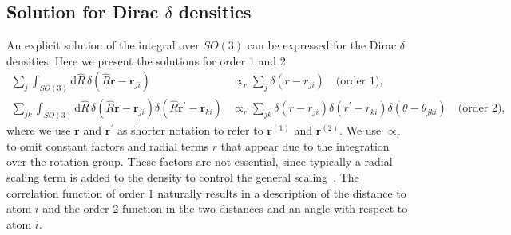 \subsection{Solution for Dirac $\delta$ densities}

An explicit solution of the integral over $SO(3)$ can be expressed for the Dirac $\delta$ densities.
Here we present the solutions for order 1 and 2 
\begin{subequations}
\label{eq:dirac_delta_haar_integral}
\begin{align}
    \label{eq:dirac_delta_haar_integral_2body}
    \sum_j \int_{SO(3)} \mathrm{d}\hat{R}\, \delta(\hat{R}\mathbf{r}-\mathbf{r}_{ji}) &\propto_r \sum_j \delta(r-r_{ji})\quad\textrm{(order 1)},  \\%
    \label{eq:dirac_delta_haar_integral_3body}
    \sum_{jk}\int_{SO(3)} \mathrm{d}\hat{R}\, \delta(\hat{R}\mathbf{r}-\mathbf{r}_{ji}) \delta(\hat{R}\mathbf{r}^\prime-\mathbf{r}_{ki}) &\propto_r \sum_{jk}\delta(r-r_{ji})\delta(r^\prime-r_{ki})\delta(\theta -\theta_{jki})\quad\textrm{(order 2)}, %
\end{align}
\end{subequations}
where we use $\mathbf{r}$ and $\mathbf{r}^\prime$ as shorter notation to refer to $\mathbf{r}^{(1)}$ and $\mathbf{r}^{(2)}$.
We use $\propto_r$ to omit constant factors and radial terms $r$ that appear due to the integration over the rotation group.
These factors are not essential, since typically a radial scaling term is added to the density to control the general scaling~\cite{behler2011atom,huan-vonl16jcp,will+18pccp,drautz2019atomic}.
The correlation function of order 1 naturally results in a description of the distance to atom $i$ and the order 2 function in the two distances and an angle with respect to atom $i$.
